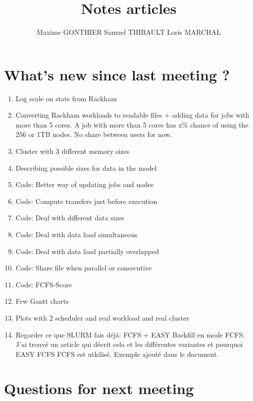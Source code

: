 \documentclass[a4paper]{article}
\title{Notes articles}
\author{Maxime GONTHIER Samuel THIBAULT Loris MARCHAL}
\begin{document}
\newpage

\section{What's new since last meeting ?}

	\begin{enumerate}
		\item Log scale on stats from Rackham
		\item Converting Rackham workloads to readable files + adding data for jobs with more than 5 cores. A job with more than 5 cores has x\% chance of using the 256 or 1TB nodes. No share between users for now.
		\item Cluster with 3 different memory sizes
		\item Describing possible sizes for data in the model
		\item Code: Better way of updating jobs and nodes
		\item Code: Compute transfers just before execution
		\item Code: Deal with different data sizes
		\item Code: Deal with data load simultaneous
		\item Code: Deal with data load partially overlapped
		\item Code: Share file when parallel or consecutive
		\item Code: FCFS-Score
		\item Few Gantt charts
		\item Plots with 2 scheduler and real workload and real cluster
		\item Regarder ce que SLURM fais déjà: FCFS + EASY Backfill en mode FCFS. J'ai trouvé un article qui décrit cela et les différentes variantes et pourquoi EASY FCFS FCFS est utkilisé. Exemple ajouté dans le document.
	\end{enumerate}
	
\section{Questions for next meeting}
\end{document}
